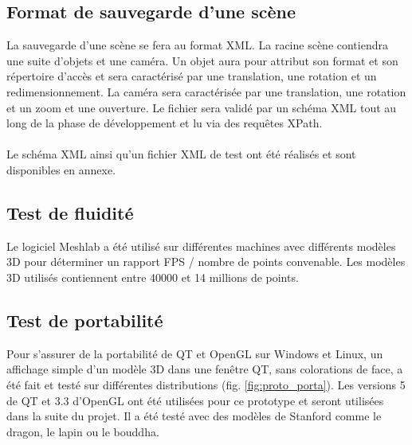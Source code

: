 \subsection{Format de sauvegarde d'une scène}

La sauvegarde d’une scène se fera au format XML. La racine scène contiendra une suite d’objets et une caméra. Un objet aura pour attribut son format et son répertoire d’accès et sera caractérisé par une translation, une rotation et un redimensionnement. La caméra sera caractérisée par une translation, une rotation et un zoom et une ouverture. Le fichier sera validé par un schéma XML tout au long de la phase de développement et lu via des requêtes XPath.

\paragraph{}
Le schéma XML ainsi qu’un fichier XML de test ont été réalisés et sont disponibles en annexe.

\subsection{Test de fluidité}

Le logiciel Meshlab a été utilisé sur différentes machines avec différents modèles 3D pour déterminer un rapport FPS / nombre de points convenable. Les modèles 3D utilisés contiennent entre 40000 et 14 millions de points.

\subsection{Test de portabilité}

Pour s’assurer de la portabilité de QT et OpenGL sur Windows et Linux, un affichage simple d’un modèle 3D dans une fenêtre QT, sans colorations de face, a été fait et testé sur différentes distributions (fig. \ref{fig:proto_porta}). Les versions 5 de QT et 3.3 d’OpenGL ont été utilisées pour ce prototype et seront utilisées dans la suite du projet. Il a été testé avec des modèles de Stanford comme le dragon, le lapin ou le bouddha.

